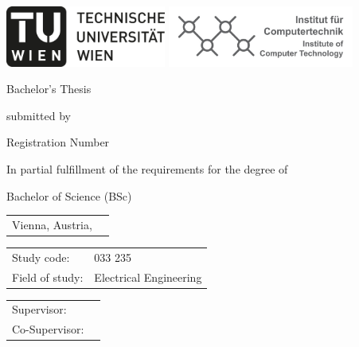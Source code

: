 %
%
\begin{titlepage}

	\begin{center}

	\includegraphics[height=2cm]{fig/logo-tu-bw.png}%
	\hfill{}%
	\includegraphics[height=2cm]{fig/logo-ict.png}%


	\vspace{5em}

	{\Huge Bachelor's Thesis}
	\vspace{2em}

	{\large submitted by}

	\vspace{3em}

	{\huge \theauthor}

	{\large Registration Number \registrationnumber}

	\vspace{3em}

	{\Huge \thetitle}

	\vspace{3em}
	{\large In partial fulfillment of the requirements for the degree of}

	\vspace{3em}

	{\Large Bachelor of Science (BSc)}

	\end{center}

	\vspace{3em}

	\large
	\begin{tabular}{m{}m{}}
	Vienna, Austria, \submissiondate & \\
	\end{tabular}

	\vspace{2em}

	\begin{tabular}{m{}m{}}
	Study code:     & 033 235 \\
	Field of study: & Electrical Engineering \\
	\end{tabular}

	\vspace{2em}

	\begin{tabular}{m{}m{}}
	Supervisor:    & \supervisor \\
	Co-Supervisor: & \cosupervisor \\
	\end{tabular}

\end{titlepage}
